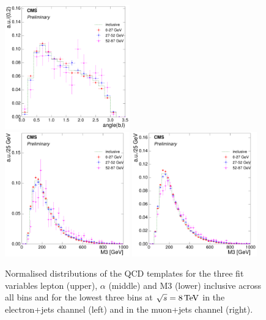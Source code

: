 \begin{figure}[hbtp]
     \includegraphics[width=0.48\textwidth]{Chapters/04_Analysis/04b_XSections/images/8TeV/fit_variables/muon/MET/angle_bl/qcd/MET_angle_bl_1orMoreBtag_QCD_template_comparison.pdf}\\
     \includegraphics[width=0.48\textwidth]{Chapters/04_Analysis/04b_XSections/images/8TeV/fit_variables/electron/MET/M3/qcd/MET_M3_0orMoreBtag_QCD_template_comparison.pdf}\hfill
     \includegraphics[width=0.48\textwidth]{Chapters/04_Analysis/04b_XSections/images/8TeV/fit_variables/muon/MET/M3/qcd/MET_M3_0orMoreBtag_QCD_template_comparison.pdf}\\
	 \caption[Normalised distributions of the QCD templates for the three fit variables in \met bins
	 at $\roots=8\TeV$.]{Normalised distributions of the QCD templates for the three fit variables lepton \abseta
	 (upper), $\alpha$ (middle) and M3 (lower) inclusive across all \met bins and for the lowest three \met bins
	 at $\roots=8\TeV$ in the electron+jets channel (left) and in the muon+jets channel (right).}
     \label{fig:fit_variable_qcd_comparisons_8TeV}
\end{figure}

